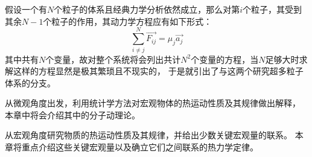 %
\chapter[热力学]{}
    \section[导论]{}
        假设一个有$N$个粒子的体系且经典力学分析依然成立，那么对第$i$个粒子，其受到其余$N-1$个粒子的作用，其动力学方程应有如下形式：
        \begin{equation}
            \sum_{i\neq j}^N \vec{F_{ij}} = \mu_j \vec{a_j}
            \nonumber
        \end{equation}    
        其中共有$N$个变量，故对整个系统将会列出共计$N^2$个变量的方程，当$N$足够大时求解这样的方程显然是极其繁琐且不现实的，
        于是就引出了与\linebreak 这两个研究超多粒子体系的分支。

        从微观角度出发，利用统计学方法对宏观物体的热运动性质及其规律做出解释，
        本章中将会介绍其中的分子动理论。

        从宏观角度研究物质的热运动性质及其规律，并给出少数关键宏观量的联系。
        本章将重点介绍这些关键宏观量以及确立它们之间联系的热力学定律。
